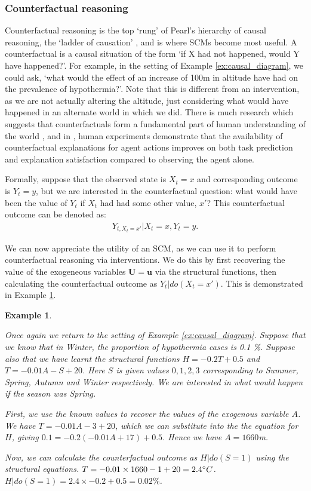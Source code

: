 \documentclass{article}
\newtheorem{example}[theorem]{Example}
\begin{document}
\subsubsection{Counterfactual reasoning}
Counterfactual reasoning is the top `rung' of Pearl's hierarchy of causal reasoning, the `ladder of causation' \cite{pearl2018book}, and is where SCMs become most useful. A counterfactual is a causal situation of the form `if X had not happened, would Y have happened?'. For example, in the setting of Example \ref{ex:causal_diagram}, we could ask, `what would the effect of an increase of 100m in altitude have had on the prevalence of hypothermia?'. Note that this is different from an intervention, as we are not actually altering the altitude, just considering what would have happened in an alternate world in which we did.  There is much research which suggests that counterfactuals form a fundamental part of human understanding of the world \cite{madumal2020distal}, and in \cite{madumal2020explainable}, human experiments demonstrate that the availability of counterfactual explanations for agent actions improves on both task prediction and explanation satisfaction compared to observing the agent alone. 

Formally, suppose that the observed state is $X_t = x$ and corresponding outcome is $Y_t = y$, but we are interested in the counterfactual question: what would have been the value of $Y_t$ if $X_t$ had had some other value, $x'$? This counterfactual outcome can be denoted as:
\begin{align*}
    Y_{t, X_t = x'} | X_t = x, Y_t = y.
\end{align*}

We can now appreciate the utility of an SCM, as we can use it to perform counterfactual reasoning via interventions. We do this by first recovering the value of the exogeneous variables $\mathbf{U = u} $ via the structural functions, then calculating the counterfactual outcome as $Y_t|do(X_t = x')$. This is demonstrated in Example \ref{ex:counterfactual calculation}. 
\begin{example}
\label{ex:counterfactual calculation}

Once again we return to the setting of Example \ref{ex:causal_diagram}. Suppose that we know that in Winter, the proportion of hypothermia cases is 0.1 \%. Suppose also that we have learnt the structural functions $H = -0.2T + 0.5$  and $ T = -0.01A -S +20$. Here $S$ is given values $0,1,2,3$ corresponding to Summer, Spring, Autumn and Winter respectively. We are interested in what would happen if the season was Spring. 

First, we use the known values to recover the values of the exogenous variable $A$. We have $T = - 0.01A - 3 + 20 $, which we can substitute into the the equation for $H$, giving $0.1 = -0.2(-0.01A +17) + 0.5$. Hence we have $A = 1660 $m. 


Now, we can calculate the counterfactual outcome as $H | do(S = 1) $ using the structural equations. $T = -0.01 \times 1660 -1  + 20 = 2.4 \degree C$. $H | do(S = 1) = 2.4 \times -0.2 + 0.5 = 0.02 \%$. 

\end{example}
\end{document}
